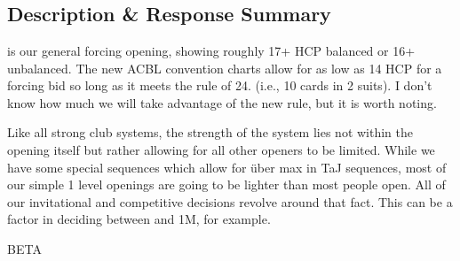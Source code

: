 \documentclass[tom-ari]{subfile}
\begin{document}
	
	\chapter[1C]{}
		
	\section{Description \& Response Summary}
	
	 is our general forcing opening, showing roughly 17+ HCP balanced or 16+ unbalanced.  The new ACBL convention charts allow for as low as 14 HCP for a forcing bid so long as it meets the rule of 24.  (i.e., 10 cards in 2 suits).  I don't know how much we will take advantage of the new rule, but it is worth noting.
	
	Like all strong club systems, the strength of the system lies not within the  opening itself but rather allowing for all other openers to be limited.  While we have some special sequences which allow for \"{u}ber max in TaJ sequences, most of our simple 1 level openings are going to be lighter than most people open.  All of our invitational and competitive decisions revolve around that fact.  This can be a factor in deciding between  and 1M, for example.
	
	\Huge{\color{red}BETA}
		
	\normalsize
	
	
	
\end{document}
